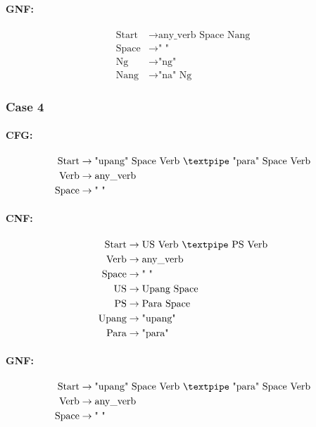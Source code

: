 \paragraph{GNF:}

\begin{equation*}
    \begin{aligned}
        \text{Start} &\rightarrow \text{any\_verb Space Nang} \\
        \text{Space} &\rightarrow \text{" "} \\
        \text{Ng} &\rightarrow \text{"ng"} \\
        \text{Nang} &\rightarrow \text{"na" Ng}
    \end{aligned}
\end{equation*}


\subsubsection{Case 4}

\paragraph{CFG:}

\begin{equation*}
    \begin{aligned}
        \text{Start} &\rightarrow \text{"upang" Space Verb {\textpipe} "para" Space Verb} \\
        \text{Verb} &\rightarrow \text{any\_verb} \\
        \text{Space} &\rightarrow \text{" "}
    \end{aligned}
\end{equation*}

\paragraph{CNF:}

\begin{equation*}
    \begin{aligned}
        \text{Start} &\rightarrow \text{US Verb {\textpipe} PS Verb} \\
        \text{Verb} &\rightarrow \text{any\_verb} \\
        \text{Space} &\rightarrow \text{" "} \\
        \text{US} &\rightarrow \text{Upang Space} \\
        \text{PS} &\rightarrow \text{Para Space} \\
        \text{Upang} &\rightarrow \text{"upang"} \\
        \text{Para} &\rightarrow \text{"para"}
    \end{aligned}
\end{equation*}

\paragraph{GNF:}

\begin{equation*}
    \begin{aligned}
        \text{Start} &\rightarrow \text{"upang" Space Verb {\textpipe} "para" Space Verb} \\
        \text{Verb} &\rightarrow \text{any\_verb} \\
        \text{Space} &\rightarrow \text{" "}
    \end{aligned}
\end{equation*}